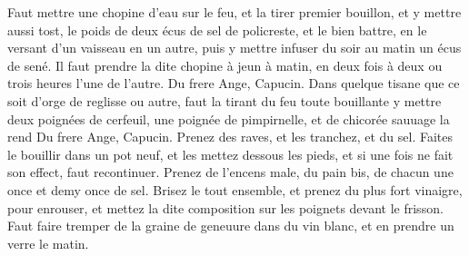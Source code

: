 \pend%
\pstart%
\protect{}
Faut mettre une chopine d'eau sur le feu, et la tirer
premier bouillon, et y mettre aussi tost, le poids de deux \'{e}cus de sel\protect{} de policreste\protect{}, et le bien battre, en le versant d'un vaisseau en un autre, puis y mettre infuser du soir au matin un \'{e}cus de sen\'{e}\protect{}. Il faut prendre la dite chopine \`{a} jeun \`{a} matin, en deux fois \`{a} deux ou trois heures l'une de l'autre.
\pend%
\pstart%
Du frere Ange,\protect{} Capucin.
\pend%
\newpage
\pstart%
Dans quelque tisane\protect{} que ce soit d'orge\protect{} de reglisse\protect{} ou autre, faut la tirant du feu toute bouillante y mettre deux poign\'{e}es de cerfeuil\protect{}, une poign\'{e}e de pimpirnelle\protect{}, et de chicor\'{e}e\protect{} sauuage la rend
Du frere Ange,\protect{} Capucin.
\pend%
\pstart%
\protect{}
Prenez des raves\protect{}, et les tranchez, et du sel.\protect{}
Faites le bouillir dans un pot neuf, et les mettez dessous les pieds, et si une fois ne fait son effect, faut recontinuer.
\pend%
\pstart%
\protect{}
Prenez de l'encens\protect{} male, du pain bis\protect{}, de chacun une once et demy once de sel\protect{}. Brisez le tout ensemble, et prenez du plus fort vinaigre\protect{}, pour enrouser, et mettez la dite composition sur les poignets devant le frisson.
\pend%
\pstart%
\protect{}
Faut faire tremper de la graine de geneuure\protect{} dans du vin\protect{} blanc, et en prendre un verre le matin.
